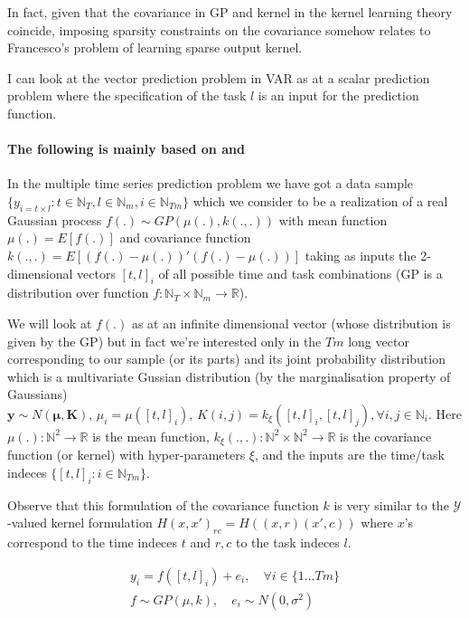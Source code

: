\documentclass[a4paper]{article}
\newcommand{\vc}[1]{\mathbf{#1}}
\newif\ifShowComments
\newcommand{\note}[1]{\ifShowComments {\color{blue}\emph{Note: #1}} \else {} \fi}
\begin{document}
In fact, given that the covariance in GP and kernel in the kernel learning theory coincide, imposing sparsity constraints on the covariance somehow relates to Francesco's problem of learning sparse output kernel.

I can look at the vector prediction problem in VAR as at a scalar prediction problem where the specification of the task $l$ is an input for the prediction function.

\paragraph{The following is mainly based on \cite{Turner2012} and \cite{Rasmussen2006}}
In the multiple time series prediction problem we have got a data sample $\{ y_{i = t \times l} : t \in \mathbb{N}_T, l \in \mathbb{N}_m, i \in \mathbb{N}_{Tm}\}$ which we consider to be a realization of a real Gaussian process $f(.) \sim \mathit{GP}(\mu(.),k(.,.))$ with mean function $\mu(.) = E[f(.)]$ and covariance function $k(.,.) = E[ (f(.)-\mu(.))' (f(.)-\mu(.))]$ taking as inputs the 2-dimensional vectors $[t,l]_i$ of all possible time and task combinations (GP is a distribution over function $f: \mathbb{N}_T \times \mathbb{N}_m \rightarrow \mathbb{R}$).

We will look at $f(.)$ as at an infinite dimensional vector (whose distribution is given by the GP) but in fact we're interested only in the $Tm$ long vector corresponding to our sample (or its parts) and its joint probability distribution which is a multivariate Gussian distribution (by the marginalisation property of Gaussians) $\vc{y} \sim \mathit{N}(\vc{\mu}, \vc{K}), \, \mu_i = \mu([t,l]_i), \, K(i,j) = k_{\xi}([t,l]_i,[t,l]_j), \forall i,j \in \mathbb{N}_i$.
Here $\mu(.) : \mathbb{N}^2 \rightarrow \mathbb{R}$ is the mean function, $k_\xi(.,.) : \mathbb{N}^2 \times \mathbb{N}^2 \rightarrow \mathbb{R}$ is the covariance function (or kernel) with hyper-parameters $\xi$, and the inputs are the time/task indeces $\{[t,l]_i: i \in \mathbb{N}_{Tm}\}$. 

Observe that this formulation of the covariance function $k$ is very similar \note{identical?} to the $\mathcal{Y}$-valued kernel formulation $H(x,x')_{rc} = H((x,r)(x',c))$ where $x$'s correspond to the time indeces $t$ and $r,c$ to the task indeces $l$.

\begin{eqnarray}
& y_{i} = f([t,l]_i) + e_{i}, \quad \forall i \in \{1 \ldots Tm\} & \\
& f \sim \mathit{GP}(\mu,k), \quad e_{i} \sim \mathit{N}(0,\sigma^2) & \nonumber
\end{eqnarray}
\end{document}
